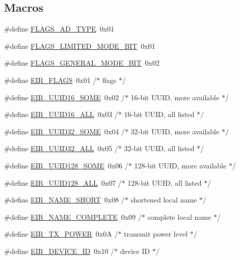 \subsection*{Macros}
\begin{DoxyCompactItemize}
\item 
\#define \mbox{\hyperlink{scan-adv_8c_a2361e23842880e5ef5da114d12ddcd12}{F\+L\+A\+G\+S\+\_\+\+A\+D\+\_\+\+T\+Y\+PE}}~0x01
\item 
\#define \mbox{\hyperlink{scan-adv_8c_a7a6adbb2c3b6a0f37dbdb0aed46c4378}{F\+L\+A\+G\+S\+\_\+\+L\+I\+M\+I\+T\+E\+D\+\_\+\+M\+O\+D\+E\+\_\+\+B\+IT}}~0x01
\item 
\#define \mbox{\hyperlink{scan-adv_8c_a53bfaf11bd7045e3de1c6b5f11422594}{F\+L\+A\+G\+S\+\_\+\+G\+E\+N\+E\+R\+A\+L\+\_\+\+M\+O\+D\+E\+\_\+\+B\+IT}}~0x02
\item 
\#define \mbox{\hyperlink{scan-adv_8c_ab0f0f27f554b4403b5c9889a3e721f06}{E\+I\+R\+\_\+\+F\+L\+A\+GS}}~0x01  /$\ast$ flags $\ast$/
\item 
\#define \mbox{\hyperlink{scan-adv_8c_ad416fbd7a7fdf82686104a2bd2a35194}{E\+I\+R\+\_\+\+U\+U\+I\+D16\+\_\+\+S\+O\+ME}}~0x02  /$\ast$ 16-\/bit U\+U\+I\+D, more available $\ast$/
\item 
\#define \mbox{\hyperlink{scan-adv_8c_a899c3d3975f53fb8f01b2c74c30a504f}{E\+I\+R\+\_\+\+U\+U\+I\+D16\+\_\+\+A\+LL}}~0x03  /$\ast$ 16-\/bit U\+U\+I\+D, all listed $\ast$/
\item 
\#define \mbox{\hyperlink{scan-adv_8c_ab2aaed942da905e72b3326f5182990a7}{E\+I\+R\+\_\+\+U\+U\+I\+D32\+\_\+\+S\+O\+ME}}~0x04  /$\ast$ 32-\/bit U\+U\+I\+D, more available $\ast$/
\item 
\#define \mbox{\hyperlink{scan-adv_8c_af765f674c624a9f70ceb7c8386285e30}{E\+I\+R\+\_\+\+U\+U\+I\+D32\+\_\+\+A\+LL}}~0x05  /$\ast$ 32-\/bit U\+U\+I\+D, all listed $\ast$/
\item 
\#define \mbox{\hyperlink{scan-adv_8c_a585c785ae936c7fcbbd505605dcf2659}{E\+I\+R\+\_\+\+U\+U\+I\+D128\+\_\+\+S\+O\+ME}}~0x06  /$\ast$ 128-\/bit U\+U\+I\+D, more available $\ast$/
\item 
\#define \mbox{\hyperlink{scan-adv_8c_ac66121ee9f8cd90bd5fa8af19e48f818}{E\+I\+R\+\_\+\+U\+U\+I\+D128\+\_\+\+A\+LL}}~0x07  /$\ast$ 128-\/bit U\+U\+I\+D, all listed $\ast$/
\item 
\#define \mbox{\hyperlink{scan-adv_8c_aa8df6441cf5c8e669d6c2951f32ad1e8}{E\+I\+R\+\_\+\+N\+A\+M\+E\+\_\+\+S\+H\+O\+RT}}~0x08  /$\ast$ shortened local name $\ast$/
\item 
\#define \mbox{\hyperlink{scan-adv_8c_acf6ccd1a728c71874c21b07ea57916aa}{E\+I\+R\+\_\+\+N\+A\+M\+E\+\_\+\+C\+O\+M\+P\+L\+E\+TE}}~0x09  /$\ast$ complete local name $\ast$/
\item 
\#define \mbox{\hyperlink{scan-adv_8c_a61a43f30af5173e0409b901d2899e72a}{E\+I\+R\+\_\+\+T\+X\+\_\+\+P\+O\+W\+ER}}~0x0\+A  /$\ast$ transmit power level $\ast$/
\item 
\#define \mbox{\hyperlink{scan-adv_8c_ad046894fb11af9945b332bf79e643bc2}{E\+I\+R\+\_\+\+D\+E\+V\+I\+C\+E\+\_\+\+ID}}~0x10  /$\ast$ device I\+D $\ast$/
\end{DoxyCompactItemize}
